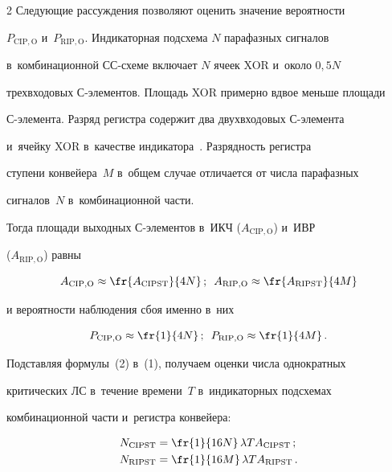 \begin{multicols}{2}
  Следующие рассуждения позволяют оценить значение вероятности 

$P_{\mathrm{CIP,O}}$ и~$P_{\mathrm{RIP,O}}$. Индикаторная подсхема $N$ парафазных сигналов 

в~комбинационной СС-схе\-ме включает $N$ ячеек XOR и~около $0{,}5N$ 

трехвходовых С-эле\-мен\-тов. Площадь XOR примерно вдвое меньше площади  

С-эле\-мен\-та. Разряд регистра содержит два двухвходовых С-эле\-мен\-та 

и~ячейку XOR в~качестве индикатора~\cite{5-sok}. Разрядность регистра 

ступени конвейера~$M$ в~общем случае отличается от числа парафазных 

сигналов~$N$ в~комбинационной части.

  

  Тогда площади выходных С-эле\-мен\-тов в~ИКЧ ($A_{\mathrm{CIP,O}}$) и~ИВР 

($A_{\mathrm{RIP,O}}$) равны 

  $$

  A_{\mathrm{CIP,O}}\approx \fr{A_{\mathrm{CIPST}}}{4N}\,;\enskip

  A_{\mathrm{RIP,O}}\approx \fr{A_{\mathrm{RIPST}}}{4M}

  $$

и вероятности наблюдения сбоя именно в~них

\begin{equation}

P_{\mathrm{CIP,O}}\approx\fr{1}{4N}\,;\enskip P_{\mathrm{RIP,O}}\approx \fr{1}{4M}\,.

\label{e2-sok}

\end{equation}

  

  Подставляя формулы~(2) в~(1), получаем оценки  числа однократных 

критических ЛС в~течение времени~$T$ в~индикаторных подсхемах 

комбинационной части и~регистра конвейера:

  \begin{align*}

  N_{\mathrm{CIPST}} &=\fr{1}{16N}\,\lambda TA_{\mathrm{CIPST}}\,;\\

  N_{\mathrm{RIPST}}&= \fr{1}{16M}\,\lambda T A_{\mathrm{RIPST}}\,.



\end{align*}
\end{multicols}
